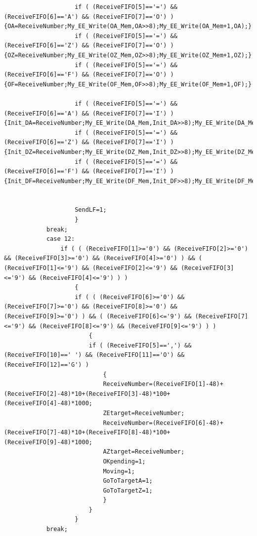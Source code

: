 \documentclass[
  a4paper,
  twoside,
  titlepage,
  11pt]{article}
\numberwithin{equation}{section}
\numberwithin{figure}{section}
\numberwithin{table}{section}
\begin{document}
\begin{verbatim}
                    if ( (ReceiveFIFO[5]=='=') && (ReceiveFIFO[6]=='A') && (ReceiveFIFO[7]=='O') ) {OA=ReceiveNumber;My_EE_Write(OA_Mem,OA>>8);My_EE_Write(OA_Mem+1,OA);}
                    if ( (ReceiveFIFO[5]=='=') && (ReceiveFIFO[6]=='Z') && (ReceiveFIFO[7]=='O') ) {OZ=ReceiveNumber;My_EE_Write(OZ_Mem,OZ>>8);My_EE_Write(OZ_Mem+1,OZ);}
                    if ( (ReceiveFIFO[5]=='=') && (ReceiveFIFO[6]=='F') && (ReceiveFIFO[7]=='O') ) {OF=ReceiveNumber;My_EE_Write(OF_Mem,OF>>8);My_EE_Write(OF_Mem+1,OF);}

                    if ( (ReceiveFIFO[5]=='=') && (ReceiveFIFO[6]=='A') && (ReceiveFIFO[7]=='I') ) {Init_DA=ReceiveNumber;My_EE_Write(DA_Mem,Init_DA>>8);My_EE_Write(DA_Mem+1,Init_DA);}
                    if ( (ReceiveFIFO[5]=='=') && (ReceiveFIFO[6]=='Z') && (ReceiveFIFO[7]=='I') ) {Init_DZ=ReceiveNumber;My_EE_Write(DZ_Mem,Init_DZ>>8);My_EE_Write(DZ_Mem+1,Init_DZ);}
                    if ( (ReceiveFIFO[5]=='=') && (ReceiveFIFO[6]=='F') && (ReceiveFIFO[7]=='I') ) {Init_DF=ReceiveNumber;My_EE_Write(DF_Mem,Init_DF>>8);My_EE_Write(DF_Mem+1,Init_DF);}
                    
                    
                    SendLF=1;
                    }
            break;
            case 12:
                if ( ( (ReceiveFIFO[1]>='0') && (ReceiveFIFO[2]>='0') && (ReceiveFIFO[3]>='0') && (ReceiveFIFO[4]>='0') ) && ( (ReceiveFIFO[1]<='9') && (ReceiveFIFO[2]<='9') && (ReceiveFIFO[3]<='9') && (ReceiveFIFO[4]<='9') ) )
                    {
                    if ( ( (ReceiveFIFO[6]>='0') && (ReceiveFIFO[7]>='0') && (ReceiveFIFO[8]>='0') && (ReceiveFIFO[9]>='0') ) && ( (ReceiveFIFO[6]<='9') && (ReceiveFIFO[7]<='9') && (ReceiveFIFO[8]<='9') && (ReceiveFIFO[9]<='9') ) )
                        {
                        if ( (ReceiveFIFO[5]==',') && (ReceiveFIFO[10]==' ') && (ReceiveFIFO[11]=='O') && (ReceiveFIFO[12]=='G') )
                            {
                            ReceiveNumber=(ReceiveFIFO[1]-48)+(ReceiveFIFO[2]-48)*10+(ReceiveFIFO[3]-48)*100+(ReceiveFIFO[4]-48)*1000;
                            ZEtarget=ReceiveNumber;
                            ReceiveNumber=(ReceiveFIFO[6]-48)+(ReceiveFIFO[7]-48)*10+(ReceiveFIFO[8]-48)*100+(ReceiveFIFO[9]-48)*1000;
                            AZtarget=ReceiveNumber;
                            OKpending=1;
                            Moving=1;
                            GoToTargetA=1;
                            GoToTargetZ=1;                  
                            }
                        }
                    }
            break;
            

\end{verbatim}
\end{document}
